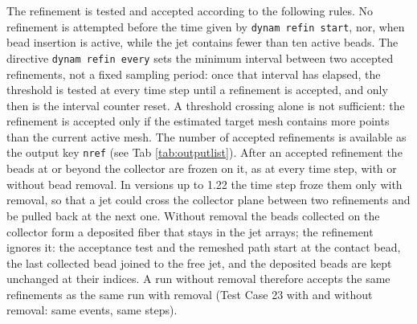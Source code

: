 The refinement is tested and accepted according to the following rules.
No refinement is attempted before the time given by \texttt{dynam refin
start}, nor, when bead insertion is active, while the jet contains fewer than
ten active beads. The directive \texttt{dynam refin every} sets the minimum
interval between two accepted refinements, not a fixed sampling period: once
that interval has elapsed, the threshold is tested at every time step until a
refinement is accepted, and only then is the interval counter reset. A
threshold crossing alone is not sufficient: the refinement is accepted only if
the estimated target mesh contains more points than the current active mesh.
The number of accepted refinements is available as the output key
\texttt{nref} (see Tab \ref{tab:outputlist}).  After an accepted refinement
the beads at or beyond the collector are frozen on it, as at every time
step, with or without bead removal.  In versions up to 1.22 the time step froze
them only with removal, so that a jet could cross the collector plane between
two refinements and be pulled back at the next one.  Without removal the
beads collected on the collector form a deposited fiber that stays in the jet
arrays; the refinement ignores it: the acceptance test and the remeshed path
start at the contact bead, the last collected bead joined to the free jet,
and the deposited beads are kept unchanged at their indices.  A run without
removal therefore accepts the same refinements as the same run with removal
(Test Case 23 with and without removal: same events, same steps).

